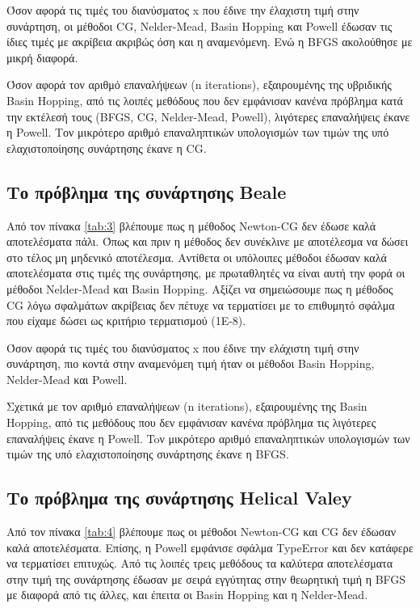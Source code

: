 \documentclass[a4paper,12pt,twoside]{report}
\theoremstyle{plain}
\theoremstyle{definition}
\theoremstyle{remark}
\begin{document}
Όσον αφορά τις τιμές του διανύσματος x που έδινε την έλαχιστη τιμή στην συνάρτηση, οι μέθοδοι CG, Nelder-Mead, Basin Hopping και Powell έδωσαν τις ίδιες τιμές με ακρίβεια ακριβώς όση και η αναμενόμενη. Ενώ η BFGS ακολούθησε με μικρή διαφορά.

Όσον αφορά τον αριθμό επαναλήψεων (n iterations), εξαιρουμένης της υβριδικής Basin Hopping, από τις λοιπές μεθόδους που δεν εμφάνισαν κανένα πρόβλημα κατά την εκτέλεσή τους (BFGS, CG, Nelder-Mead, Powell), λιγότερες επαναλήψεις έκανε η Powell. Τον μικρότερο αριθμό επαναληπτικών υπολογισμών των τιμών της υπό ελαχιστοποίησης συνάρτησης έκανε η CG.

\subsection{Το πρόβλημα της συνάρτησης Beale}

Από τον πίνακα \ref{tab:3} βλέπουμε πως η μέθοδος Newton-CG δεν έδωσε καλά αποτελέσματα πάλι. Όπως και πριν η μέθοδος δεν συνέκλινε με αποτέλεσμα να δώσει στο τέλος μη μηδενικό αποτέλεσμα. Αντίθετα οι υπόλοιπες μέθοδοι έδωσαν καλά αποτελέσματα στις τιμές της συνάρτησης, με πρωταθλητές να είναι αυτή την φορά οι μέθοδοι Nelder-Mead και Basin Hopping. Αξίζει να σημειώσουμε πως η μέθοδος CG λόγω σφαλμάτων ακρίβειας δεν πέτυχε να τερματίσει με το επιθυμητό σφάλμα που είχαμε δώσει ως κριτήριο τερματισμού (1Ε-8).

Όσον αφορά τις τιμές του διανύσματος x που έδινε την ελάχιστη τιμή στην συνάρτηση, πιο κοντά στην αναμενόμεη τιμή ήταν οι μέθοδοι Basin Hopping, Nelder-Mead και Powell.

Σχετικά με τον αριθμό επαναλήψεων (n iterations), εξαιρουμένης της Basin Hopping, από τις μεθόδους που δεν εμφάνισαν κανένα πρόβλημα τις λιγότερες επαναλήψεις έκανε η Powell. Toν μικρότερο αριθμό επαναληπτικών υπολογισμών των τιμών της υπό ελαχιστοποίησης συνάρτησης έκανε η BFGS.

\subsection{Το πρόβλημα της συνάρτησης Helical Valey}

Από τον πίνακα \ref{tab:4} βλέπουμε πως οι μέθοδοι Newton-CG και CG δεν έδωσαν καλά αποτελέσματα. Επίσης, η Powell εμφάνισε σφάλμα TypeError και δεν κατάφερε να τερματίσει επιτυχώς. Από τις λοιπές τρεις μεθόδους τα καλύτερα αποτελέσματα στην τιμή της συνάρτησης έδωσαν με σειρά εγγύτητας στην θεωρητική τιμή η BFGS με διαφορά από τις άλλες, και έπειτα οι Basin Hopping και η Nelder-Mead.
\end{document}
